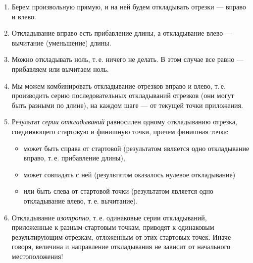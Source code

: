 \begin{enumerate}\setlength{\itemsep}{1pt}
\item Берем произвольную прямую, и на ней будем откладывать отрезки --- вправо и влево.
\item Откладывание вправо есть прибавление длины, а откладывание влево --- вычитание (уменьшение) длины.
\item Можно откладывать ноль, т.\,е. ничего не делать. В этом случае все равно --- прибавляем или вычитаем ноль.
\item Мы можем комбинировать откладывание отрезков вправо и влево, т.\,е. производить серию последовательных откладываний отрезков (они могут быть разными по длине), на каждом шаге --- от текущей точки приложения.
\item Результат \textit{серии откладываний} равносилен одному откладыванию отрезка, соединяющего стартовую и финишную точки, причем финишная точка:
\begin{itemize}
\item может быть справа от стартовой (результатом является одно откладывание вправо, т.\,е. прибавление длины),
\item может совпадать с ней (результатом оказалось нулевое откладывание)
\item или быть слева от стартовой точки (результатом является одно откладывание влево, т.\,е. вычитание).
\end{itemize}
\item Откладывание \textit{изотропно}, т.\,е. одинаковые серии откладываний, приложенные к разным стартовым точкам, приводят к одинаковым результирующим отрезкам, отложенным от этих стартовых точек. Иначе говоря, величина и направление откладывания не зависит от начального местоположения!
\end{enumerate}
